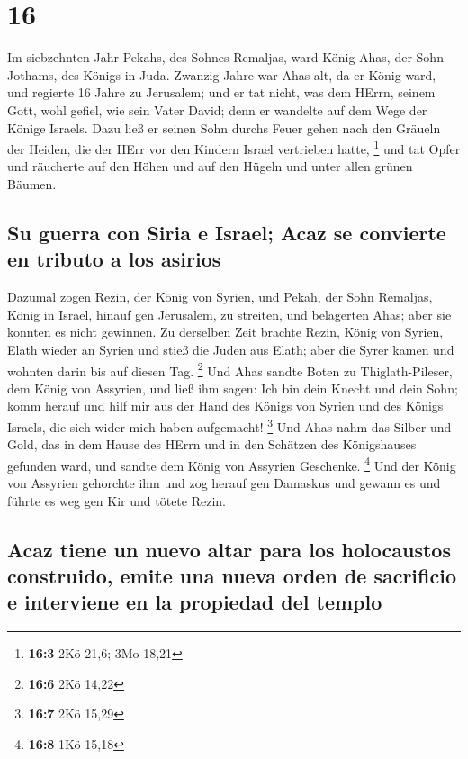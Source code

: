 \hypertarget{section-15}{%
\section{16}\label{section-15}}

 Im siebzehnten Jahr Pekahs, des Sohnes Remaljas, ward
König Ahas, der Sohn Jothams, des Königs in Juda.  Zwanzig
Jahre war Ahas alt, da er König ward, und regierte 16 Jahre zu
Jerusalem; und er tat nicht, was dem HErrn, seinem Gott, wohl gefiel,
wie sein Vater David;  denn er wandelte auf dem Wege der
Könige Israels. Dazu ließ er seinen Sohn durchs Feuer gehen nach den
Gräueln der Heiden, die der HErr vor den Kindern Israel vertrieben
hatte, \footnote{\textbf{16:3} 2Kö 21,6; 3Mo 18,21}  und
tat Opfer und räucherte auf den Höhen und auf den Hügeln und unter allen
grünen Bäumen.

\hypertarget{su-guerra-con-siria-e-israel-acaz-se-convierte-en-tributo-a-los-asirios}{%
\subsection{Su guerra con Siria e Israel; Acaz se convierte en tributo a
los
asirios}\label{su-guerra-con-siria-e-israel-acaz-se-convierte-en-tributo-a-los-asirios}}

 Dazumal zogen Rezin, der König von Syrien, und Pekah, der
Sohn Remaljas, König in Israel, hinauf gen Jerusalem, zu streiten, und
belagerten Ahas; aber sie konnten es nicht gewinnen.  Zu
derselben Zeit brachte Rezin, König von Syrien, Elath wieder an Syrien
und stieß die Juden aus Elath; aber die Syrer kamen und wohnten darin
bis auf diesen Tag. \footnote{\textbf{16:6} 2Kö 14,22} 
Und Ahas sandte Boten zu Thiglath-Pileser, dem König von Assyrien, und
ließ ihm sagen: Ich bin dein Knecht und dein Sohn; komm herauf und hilf
mir aus der Hand des Königs von Syrien und des Königs Israels, die sich
wider mich haben aufgemacht! \footnote{\textbf{16:7} 2Kö 15,29}
 Und Ahas nahm das Silber und Gold, das in dem Hause des
HErrn und in den Schätzen des Königshauses gefunden ward, und sandte dem
König von Assyrien Geschenke. \footnote{\textbf{16:8} 1Kö 15,18}
 Und der König von Assyrien gehorchte ihm und zog herauf
gen Damaskus und gewann es und führte es weg gen Kir und tötete Rezin.

\hypertarget{acaz-tiene-un-nuevo-altar-para-los-holocaustos-construido-emite-una-nueva-orden-de-sacrificio-e-interviene-en-la-propiedad-del-templo}{%
\subsection{Acaz tiene un nuevo altar para los holocaustos construido,
emite una nueva orden de sacrificio e interviene en la propiedad del
templo}\label{acaz-tiene-un-nuevo-altar-para-los-holocaustos-construido-emite-una-nueva-orden-de-sacrificio-e-interviene-en-la-propiedad-del-templo}}

